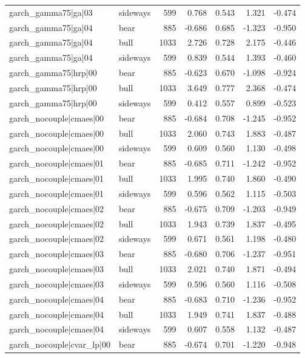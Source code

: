\begin{table}
\begin{tabular}{llrrrrr}
garch\_gamma75|ga|03 & sideways & 599 & 0.768 & 0.543 & 1.321 & -0.474 \\
garch\_gamma75|ga|04 & bear & 885 & -0.686 & 0.685 & -1.323 & -0.950 \\
garch\_gamma75|ga|04 & bull & 1033 & 2.726 & 0.728 & 2.175 & -0.446 \\
garch\_gamma75|ga|04 & sideways & 599 & 0.839 & 0.544 & 1.393 & -0.460 \\
garch\_gamma75|hrp|00 & bear & 885 & -0.623 & 0.670 & -1.098 & -0.924 \\
garch\_gamma75|hrp|00 & bull & 1033 & 3.649 & 0.777 & 2.368 & -0.474 \\
garch\_gamma75|hrp|00 & sideways & 599 & 0.412 & 0.557 & 0.899 & -0.523 \\
garch\_nocouple|cmaes|00 & bear & 885 & -0.684 & 0.708 & -1.245 & -0.952 \\
garch\_nocouple|cmaes|00 & bull & 1033 & 2.060 & 0.743 & 1.883 & -0.487 \\
garch\_nocouple|cmaes|00 & sideways & 599 & 0.609 & 0.560 & 1.130 & -0.498 \\
garch\_nocouple|cmaes|01 & bear & 885 & -0.685 & 0.711 & -1.242 & -0.952 \\
garch\_nocouple|cmaes|01 & bull & 1033 & 1.995 & 0.740 & 1.860 & -0.490 \\
garch\_nocouple|cmaes|01 & sideways & 599 & 0.596 & 0.562 & 1.115 & -0.503 \\
garch\_nocouple|cmaes|02 & bear & 885 & -0.675 & 0.709 & -1.203 & -0.949 \\
garch\_nocouple|cmaes|02 & bull & 1033 & 1.943 & 0.739 & 1.837 & -0.495 \\
garch\_nocouple|cmaes|02 & sideways & 599 & 0.671 & 0.561 & 1.198 & -0.480 \\
garch\_nocouple|cmaes|03 & bear & 885 & -0.680 & 0.706 & -1.237 & -0.951 \\
garch\_nocouple|cmaes|03 & bull & 1033 & 2.021 & 0.740 & 1.871 & -0.494 \\
garch\_nocouple|cmaes|03 & sideways & 599 & 0.596 & 0.560 & 1.116 & -0.508 \\
garch\_nocouple|cmaes|04 & bear & 885 & -0.683 & 0.710 & -1.236 & -0.952 \\
garch\_nocouple|cmaes|04 & bull & 1033 & 1.949 & 0.741 & 1.837 & -0.488 \\
garch\_nocouple|cmaes|04 & sideways & 599 & 0.607 & 0.558 & 1.132 & -0.487 \\
garch\_nocouple|cvar\_lp|00 & bear & 885 & -0.674 & 0.701 & -1.220 & -0.948 \\

\end{tabular}
\end{table}
